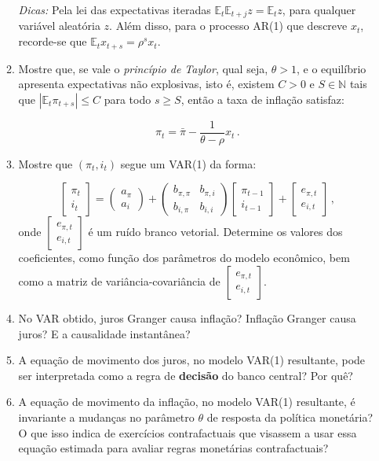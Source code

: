 \documentclass[10pt,a4paper]{article}
\begin{document}
\begin{enumerate}
\begin{enumerate}
	\textit{Dicas:} Pela lei das expectativas iteradas $\mathbb{E}_t \mathbb{E}_{t+j} z = \mathbb{E}_t z$, para qualquer variável aleatória $z$. Além disso, para o processo AR(1) que descreve $x_t$, recorde-se que $\mathbb{E}_t x_{t+s} = \rho^s x_t$.
	
	\item Mostre que, se vale o \emph{princípio de Taylor}, qual seja, $\theta > 1$, e o equilíbrio apresenta expectativas não explosivas, isto é, existem $C > 0$ e $S \in \mathbb{N}$ tais que $|\mathbb{E}_t \pi_{t+s}| \leq C$ para todo $s \geq S$, então a taxa de inflação satisfaz:
	
	$$\pi_t = \bar \pi - \frac{1}{\theta - \rho} x_t \, .$$
	
	\item Mostre que $(\pi_t, i_t)$ segue um VAR(1) da forma:
	
	$$\begin{bmatrix}
	\pi_t \\
	i_t 
	\end{bmatrix} =  \begin{pmatrix}
	a_\pi \\
	a_i
	\end{pmatrix} + \begin{pmatrix}
	b_{\pi,\pi} & b_{\pi,i} \\
	b_{i,\pi} & b_{i,i}
	\end{pmatrix}\begin{bmatrix}
	\pi_{t-1}\\
	i_{t-1}
\end{bmatrix} + \begin{bmatrix}
e_{\pi,t} \\
e_{i, t}
\end{bmatrix} \, ,$$
onde $\begin{bmatrix}
	e_{\pi,t} \\
	e_{i, t}
\end{bmatrix} $ é um ruído branco vetorial. Determine os valores dos coeficientes, como função dos parâmetros do modelo econômico, bem como a matriz de variância-covariância de $\begin{bmatrix}
e_{\pi,t} \\
e_{i, t}
\end{bmatrix} $.
\item No VAR obtido, juros Granger causa inflação? Inflação Granger causa juros? E a causalidade instantânea?
\item A equação de movimento dos juros, no modelo VAR(1) resultante, pode ser interpretada como a regra de \textbf{decisão} do banco central? Por quê?
\item A equação de movimento da inflação, no modelo VAR(1) resultante, é invariante a mudanças no parâmetro $\theta$ de resposta da política monetária? O que isso indica de exercícios contrafactuais que visassem a usar essa equação estimada para avaliar regras monetárias contrafactuais?
\end{enumerate}
\end{enumerate}
\end{document}
